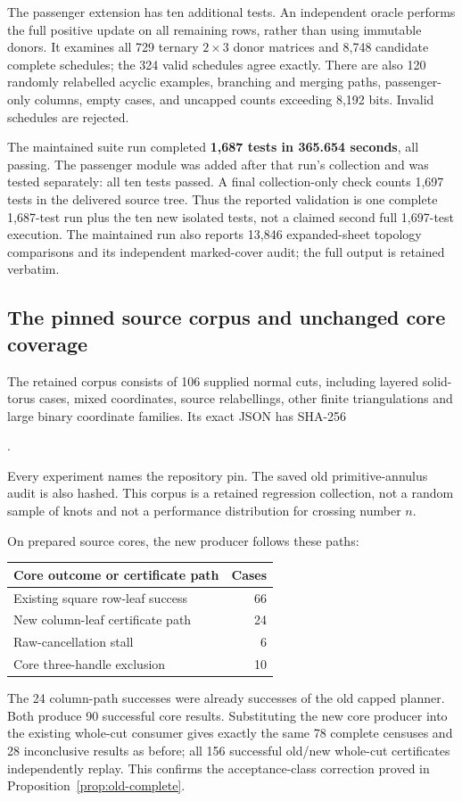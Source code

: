 The passenger extension has ten additional tests. An independent oracle
performs the full positive update on all remaining rows, rather than
using immutable donors. It examines all 729 ternary $2\times3$ donor
matrices and 8,748 candidate complete schedules; the 324 valid schedules
agree exactly. There are also 120 randomly relabelled acyclic examples,
branching and merging paths, passenger-only columns, empty cases, and
uncapped counts exceeding 8,192 bits. Invalid schedules are rejected.

The maintained suite run completed \textbf{1,687 tests in 365.654 seconds},
all passing. The passenger module was added after that run's collection
and was tested separately: all ten tests passed. A final collection-only
check counts 1,697 tests in the delivered source tree. Thus the reported
validation is one complete 1,687-test run plus the ten new isolated tests,
not a claimed second full 1,697-test execution. The maintained run also
reports 13,846 expanded-sheet topology comparisons and its independent
marked-cover audit; the full output is retained verbatim.

\subsection{The pinned source corpus and unchanged core coverage}

The retained corpus consists of 106 supplied normal cuts, including layered
solid-torus cases, mixed coordinates, source relabellings, other finite
triangulations and large binary coordinate families. Its exact JSON has
SHA-256
\begin{center}\small
{}.
\end{center}
Every experiment names the repository pin. The saved old primitive-annulus
audit is also hashed. This corpus is a retained regression collection,
not a random sample of knots and not a performance distribution for
crossing number $n$.

On prepared source cores, the new producer follows these paths:
\begin{center}
\begin{tabular}{@{}lr@{}}
\toprule
Core outcome or certificate path & Cases\\
\midrule
Existing square row-leaf success & 66\\
New column-leaf certificate path & 24\\
Raw-cancellation stall & 6\\
Core three-handle exclusion & 10\\
\bottomrule
\end{tabular}
\end{center}
The 24 column-path successes were already successes of the old capped
planner. Both produce 90 successful core results. Substituting the new
core producer into the existing whole-cut consumer gives exactly the
same 78 complete censuses and 28 inconclusive results as before; all
156 successful old/new whole-cut certificates independently replay.
This confirms the acceptance-class correction proved in
Proposition~\ref{prop:old-complete}.

